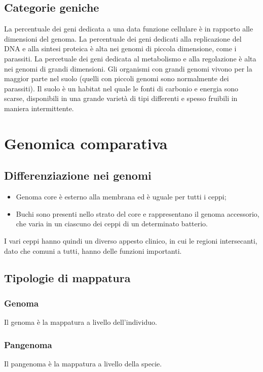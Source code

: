 	\subsection{Categorie geniche}
	La percentuale dei geni dedicata a una data funzione cellulare \`e in rapporto alle dimensioni del genoma. 
	La percentuale dei geni dedicati alla replicazione del DNA e alla sintesi proteica \`e alta nei genomi di piccola dimensione, come i parassiti. 
	La percetuale dei geni dedicata al metabolismo e alla regolazione \`e alta nei genomi di grandi dimensioni. 
 	Gli organismi con grandi genomi vivono per la maggior parte nel suolo (quelli con piccoli genomi sono normalmente dei parassiti). 
	Il suolo \`e un habitat nel quale le fonti di carbonio e energia sono scarse, disponibili in una grande variet\`a di tipi differenti e spesso fruibili in maniera intermittente. 

\section{Genomica comparativa}

	\subsection{Differenziazione nei genomi}
	\begin{itemize}
	    \item Genoma core \`e esterno alla membrana ed \`e uguale per tutti i ceppi;
	    \item Buchi sono presenti nello strato del core e rappresentano il genoma accessorio, che varia in un ciascuno dei ceppi di un determinato batterio.
	\end{itemize}
	I vari ceppi hanno quindi un diverso appesto clinico, in cui le regioni intersecanti, dato che comuni a tutti, hanno delle funzioni importanti. 
	
	\subsection{Tipologie di mappatura}

		\subsubsection{Genoma}
		Il genoma \`e la mappatura a livello dell'individuo.

		\subsubsection{Pangenoma}
		Il pangenoma \`e la mappatura a livello della specie.

